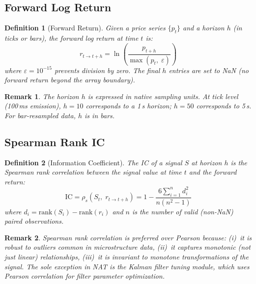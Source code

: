 \documentclass[11pt,a4paper]{article}
\newtheorem{definition}{Definition}
\newtheorem{remark}{Remark}
\begin{document}
\subsection{Forward Log Return}

\begin{definition}[Forward Return]
Given a price series $\{p_t\}$ and a horizon $h$ (in ticks or bars), the
forward log return at time $t$ is:
\begin{equation}
    r_{t \to t+h} = \ln\!\left(\frac{p_{t+h}}{\max(p_t,\; \varepsilon)}\right)
    \label{eq:fwd_return}
\end{equation}
where $\varepsilon = 10^{-15}$ prevents division by zero. The final $h$
entries are set to NaN (no forward return beyond the array boundary).
\end{definition}

\begin{remark}
The horizon $h$ is expressed in native sampling units. At tick level
(100\,ms emission), $h = 10$ corresponds to a 1\,s horizon; $h = 50$
corresponds to 5\,s. For bar-resampled data, $h$ is in bars.
\end{remark}

\subsection{Spearman Rank IC}

\begin{definition}[Information Coefficient]
The IC of a signal $S$ at horizon $h$ is the Spearman rank correlation
between the signal value at time $t$ and the forward return:
\begin{equation}
    \mathrm{IC} = \rho_s\!\left(S_t,\; r_{t \to t+h}\right)
    = 1 - \frac{6 \sum_{i=1}^{n} d_i^2}{n(n^2 - 1)}
    \label{eq:spearman}
\end{equation}
where $d_i = \mathrm{rank}(S_i) - \mathrm{rank}(r_i)$ and $n$ is the number
of valid (non-NaN) paired observations.
\end{definition}

\begin{remark}
Spearman rank correlation is preferred over Pearson because:
(i)~it is robust to outliers common in microstructure data,
(ii)~it captures monotonic (not just linear) relationships,
(iii)~it is invariant to monotone transformations of the signal.
The sole exception in NAT is the Kalman filter tuning module, which uses
Pearson correlation for filter parameter optimization.
\end{remark}
\end{document}
